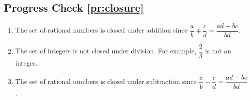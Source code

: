 \subsection*{Progress Check \ref{pr:closure}}
\begin{enumerate}
\item The set of rational numbers is closed under addition since 
$\dfrac{a}{b} + \dfrac{c}{d} = \dfrac{ad+bc}{bd}$.

\item The set of integers is not closed under division.  For example, $\dfrac{2}{3}$ is not an integer.

\item The set of rational numbers is closed under subtraction since 
$\dfrac{a}{b} - \dfrac{c}{d} = \dfrac{ad-bc}{bd}$.
\end{enumerate}
\hbreak

\endinput
